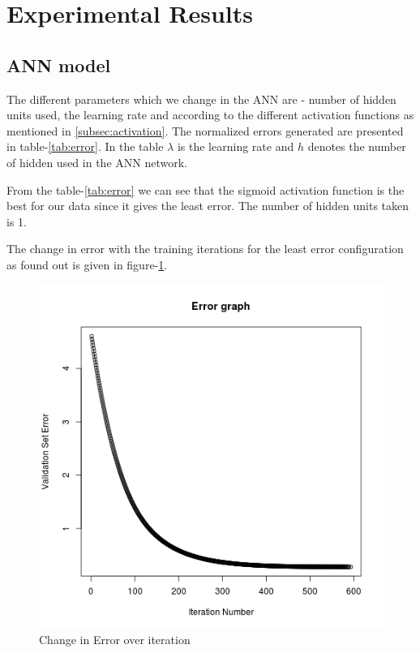 \documentclass[review,twocolumn,5p]{elsarticle}
\begin{document}
\section{Experimental Results}
\label{sec:expt-results}

\subsection{ANN model}

The different parameters which we change in the ANN are - number of hidden units used, the learning rate and according to the different activation functions as mentioned in \ref{subsec:activation}. The normalized errors generated are presented in table-\ref{tab:error}. In the table $\lambda$ is the learning rate and $h$ denotes the number of hidden used in the ANN network. 


From the table-\ref{tab:error} we can see that the sigmoid activation function is the best for our data since it gives the least error. The number of hidden units taken is 1. 

The change in error with the training iterations for the least error configuration as found out is given in figure-\ref{fig:error_plot}.

\begin{figure}[h]
\centering
\includegraphics[scale = 0.5]{pictures/errorPlot.png}
\caption{Change in Error over iteration}
\label{fig:error_plot}
\end{figure}
\end{document}

